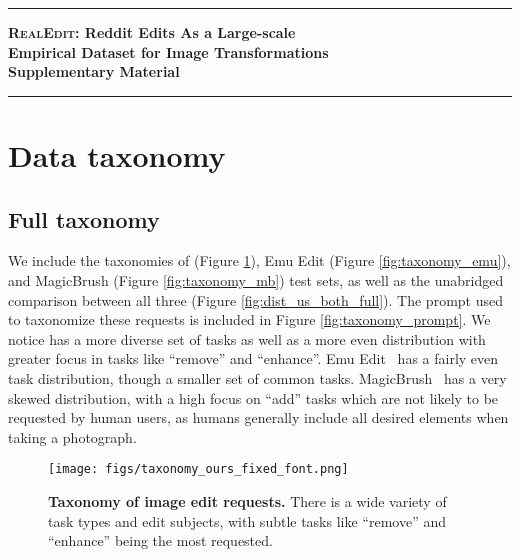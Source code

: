 
% 

\appendix

\renewcommand{\contentsname}{Table of contents}

\onecolumn
\noindent\rule{\textwidth}{1pt}
\begin{center}
\vspace{3pt}
{\LARGE\textbf{\textsc{RealEdit}: Reddit Edits As a Large-scale\\ Empirical Dataset for Image Transformations}}\\
\vspace{1em}
{\Large\textbf{Supplementary Material}}
\vspace{-3pt}
\end{center}
\noindent\rule{\textwidth}{1pt}

% 
\tableofcontents

\clearpage

\twocolumn
\section{Data taxonomy}
\subsection{Full taxonomy}
We include the taxonomies of \ours (Figure \ref{fig:taxonomy_ours}), Emu Edit (Figure \ref{fig:taxonomy_emu}), and MagicBrush (Figure \ref{fig:taxonomy_mb}) test sets, as well as the unabridged comparison between all three (Figure \ref{fig:dist_us_both_full}). The prompt used to taxonomize these requests is included in Figure \ref{fig:taxonomy_prompt}. We notice \ours has a more diverse set of tasks as well as a more even distribution with greater focus in tasks like ``remove'' and ``enhance''. Emu Edit~\cite{sheynin2024emu} has a fairly even task distribution, though a smaller set of common tasks. MagicBrush~\cite{zhang2024magicbrush} has a very skewed distribution, with a high focus on ``add'' tasks which are not likely to be requested by human users, as humans generally include all desired elements when taking a photograph. 
\begin{figure}[t]
    \centering
    \texttt{[image: figs/taxonomy\_ours\_fixed\_font.png]}
    \caption{\textbf{Taxonomy of \ours image edit requests.} There is a wide variety of task types and edit subjects, with subtle tasks like ``remove'' and ``enhance'' being the most requested.}
    \label{fig:taxonomy_ours}
\end{figure}

